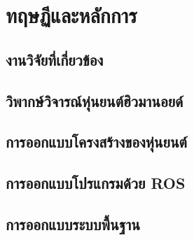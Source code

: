 \chapter{ทฤษฏีและหลักการ}

\section{งานวิจัยที่เกี่ยวข้อง}


\clearpage
\section{วิพากษ์วิจารณ์หุ่นยนต์ฮิวมานอยด์}


\clearpage
\section{การออกแบบโครงสร้างของหุ่นยนต์}


\section{การออกแบบโปรแกรมด้วย ROS}


\section{การออกแบบระบบพื้นฐาน}

